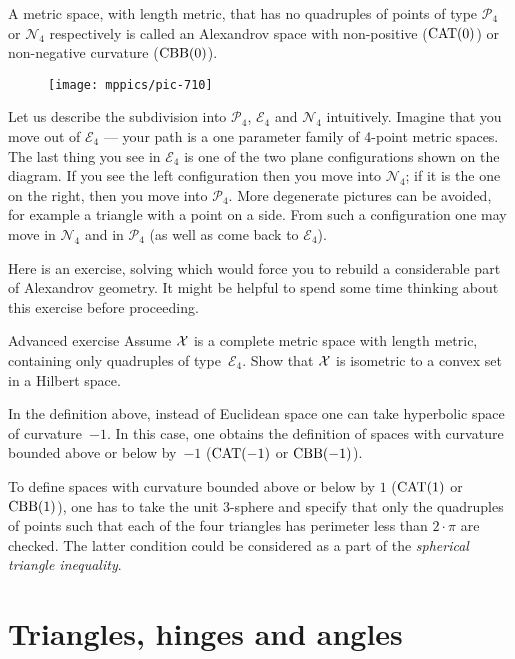 A metric space, with length metric, 
that has no quadruples of points of type $\mathcal{P}_4$ or $\mathcal{N}_4$
respectively 
is called an Alexandrov space with non-positive ($\mathrm{CAT}(0)$) or non-negative curvature ($\mathrm{CBB}(0)$).

\begin{wrapfigure}{r}{33mm}
\vskip-4mm
\centering
\texttt{[image: mppics/pic-710]}
\end{wrapfigure}

Let us describe the subdivision into  $\mathcal{P}_4$, $\mathcal{E}_4$ and $\mathcal{N}_4$ intuitively.
Imagine that you move out of $\mathcal{E}_4$ --- your path is a one parameter family of 4-point metric spaces.
The last thing you see in $\mathcal{E}_4$ is one of the two plane configurations shown on the diagram.
If you see the left configuration then you move into $\mathcal{N}_4$;
if it is the one on the right, then you move into $\mathcal{P}_4$.
More degenerate pictures can be avoided, for example a triangle with a point on a side.
From such a configuration one may move in $\mathcal{N}_4$ and in $\mathcal{P}_4$ (as well as come back to $\mathcal{E}_4$).

Here is an exercise, solving which would force you to rebuild a considerable part of Alexandrov geometry.
It might be helpful to spend some time thinking about this exercise before proceeding.

\begin{thm}{Advanced exercise}\label{ex:convex-set}
Assume $\mathcal{X}$ is a complete metric space with length metric, 
containing only quadruples of type~$\mathcal{E}_4$.
Show that $\mathcal{X}$ is isometric to a convex set in a Hilbert space.
\end{thm}

In the definition above, 
instead of  Euclidean space 
one can take  
hyperbolic space of curvature~$-1$.
In this case,
one obtains the definition of spaces with curvature bounded above or below by~$-1$ ($\mathrm{CAT}(-1)$ or $\mathrm{CBB}(-1)$).

To define spaces with curvature bounded above or below by $1$ ($\mathrm{CAT}(1)$ or $\mathrm{CBB}(1)$),
one has to take the unit 3-sphere 
and specify that only the quadruples of points such that each of the four triangles has perimeter 
less than $2\cdot\pi$ are checked.
The latter condition could be considered as a part of the {}\emph{spherical triangle inequality}.

\section{Triangles, hinges and angles}

